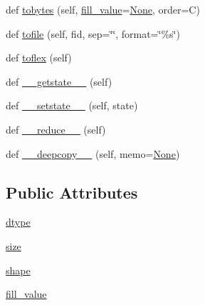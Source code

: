 \begin{DoxyCompactItemize}
\item 
def \hyperlink{classnumpy_1_1ma_1_1core_1_1MaskedArray_a573ceaaba707d62c5f1664105e30c59c}{tobytes} (self, \hyperlink{classnumpy_1_1ma_1_1core_1_1MaskedArray_a4163711b2717238c0493739e3afea1bd}{fill\+\_\+value}=\hyperlink{namespacenumpy_1_1ma_1_1core_a647ee1848dfa3692fe35a663a2aa40b3}{None}, order=\textquotesingle{}C\textquotesingle{})
\item 
def \hyperlink{classnumpy_1_1ma_1_1core_1_1MaskedArray_a334d91cce1fdc7d19cea9c7c09524f6d}{tofile} (self, fid, sep=\char`\"{}\char`\"{}, format=\char`\"{}\%s\char`\"{})
\item 
def \hyperlink{classnumpy_1_1ma_1_1core_1_1MaskedArray_a4a28da736f15749fc36f2498415465b9}{toflex} (self)
\item 
def \hyperlink{classnumpy_1_1ma_1_1core_1_1MaskedArray_a686a39da226a3ab25a5fe7b590329387}{\+\_\+\+\_\+getstate\+\_\+\+\_\+} (self)
\item 
def \hyperlink{classnumpy_1_1ma_1_1core_1_1MaskedArray_ac2ce7fa087cd97187b924f8b4cf27602}{\+\_\+\+\_\+setstate\+\_\+\+\_\+} (self, state)
\item 
def \hyperlink{classnumpy_1_1ma_1_1core_1_1MaskedArray_adfd70eed8a990371b0312d44e54f8f44}{\+\_\+\+\_\+reduce\+\_\+\+\_\+} (self)
\item 
def \hyperlink{classnumpy_1_1ma_1_1core_1_1MaskedArray_a59bc0cb23fa56d552228a13b7ff32642}{\+\_\+\+\_\+deepcopy\+\_\+\+\_\+} (self, memo=\hyperlink{namespacenumpy_1_1ma_1_1core_a647ee1848dfa3692fe35a663a2aa40b3}{None})
\end{DoxyCompactItemize}
\subsection*{Public Attributes}
\begin{DoxyCompactItemize}
\item 
\hyperlink{classnumpy_1_1ma_1_1core_1_1MaskedArray_acaf5e9f1356ae9652fc4eddef5878b18}{dtype}
\item 
\hyperlink{classnumpy_1_1ma_1_1core_1_1MaskedArray_a9a254706e66ac3d198690e7f2d134b85}{size}
\item 
\hyperlink{classnumpy_1_1ma_1_1core_1_1MaskedArray_ae013d7cfa83d232ea0f7e1eff4a0f54b}{shape}
\item 
\hyperlink{classnumpy_1_1ma_1_1core_1_1MaskedArray_a4163711b2717238c0493739e3afea1bd}{fill\+\_\+value}
\end{DoxyCompactItemize}
